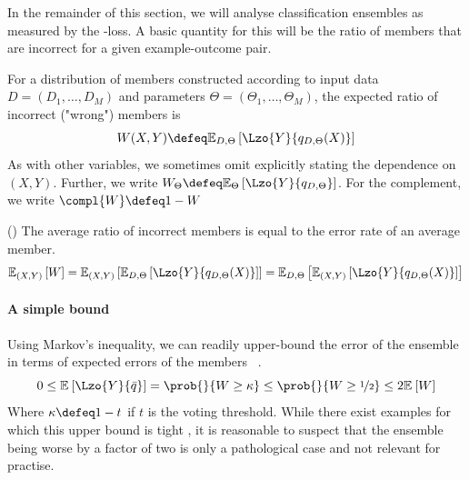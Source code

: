 \documentclass[../main.tex]{subfiles}
\begin{document}
In the remainder of this section, we will analyse classification ensembles as measured by the \zeroone-loss. 
A basic quantity for this will be the ratio of members that are incorrect for a given example-outcome pair.

\begin{definition}
For a distribution of members constructed according to input data $D = (D_{1}, \dots, D_{M})$ and parameters $\Theta = (\Theta_{1}, \dots, \Theta_{M})$, the expected ratio of incorrect ("wrong") members is
$$
W(X,Y) \defeq \mathbb{E}_{D, \Theta}\left[ \Lzo{Y}{q_{D, \Theta}(X)} \right] 
$$
As with other variables, we sometimes omit explicitly stating the dependence on $(X,Y)$. Further, we write $W_{\Theta} \defeq \mathbb{E}_{\Theta}\left[ \Lzo{Y}{q_{D, \Theta}} \right]$. For the complement, we write $\compl{W} \defeq 1 - W$
\end{definition}

\begin{lemma} (\cite{theisen_WhenAreEnsembles_2023}) The average ratio of incorrect members is equal to the error rate of an average member.
    \begin{align*} 
    \mathbb{E}_{(X,Y) }\left[ W  \right]  = \mathbb{E}_{(X,Y) }\left[ \mathbb{E}_{D,\Theta}\left[ \Lzo{Y}{q_{D,\Theta}(X)} \right]  \right]  = \mathbb{E}_{D,\Theta}\left[ \mathbb{E}_{(X,Y) }\left[ \Lzo{Y}{q_{D,\Theta}(X)} \right]  \right] 
    \end{align*}
    \label{thm:W-lzo}
\end{lemma}


\paragraph{A simple bound} Using Markov's inequality, we can readily upper-bound the error of the ensemble in terms of expected errors of the members~\cite{theisen_WhenAreEnsembles_2023}
.
$$
0 \leq \mathbb{E}_{}\left[ \Lzo{Y}{\bar{q}} \right] = \prob{}{W \geq \kappa} \leq \prob{}{W \geq \nicefrac{1}{2}} \leq 2 \mathbb{E}_{}\left[ W \right] 
$$
Where $\kappa \defeq 1-t$ if $t$ is the voting threshold.
While there exist examples for which this upper bound is tight \cite{theisen_WhenAreEnsembles_2023}, it is reasonable to suspect that the ensemble being worse by a factor of two is only a pathological case and not relevant for practise.
\end{document}
